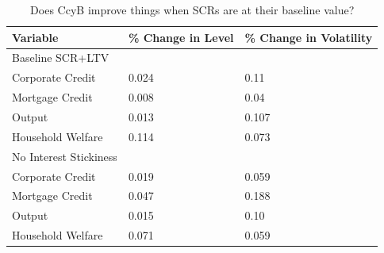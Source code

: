 \documentclass[12pt]{article}
\numberwithin{equation}{section}
\begin{document}
\begin{table}[h]
\caption{Does CcyB improve things when SCRs are at their baseline value? }
\begin{tabular}{l|l|l}
\small
Variable & \% Change in Level & \% Change in Volatility \\
\hline
Baseline SCR+LTV & & \\
\hline
    Corporate Credit           &       0.024   &      0.11 \\
    Mortgage Credit            &      0.008    &      0.04 \\
    Output         				&     0.013    &      0.107 \\ 
    Household Welfare       &         0.114     &     0.073\\
  
 \hline
No Interest Stickiness & & \\
\hline

    Corporate Credit           &       0.019    &      0.059 \\
    Mortgage Credit            &      0.047    &       0.188 \\
    Output         &     0.015    &    0.10 \\ 
    Household Welfare       &     0.071     &     0.059\\
  \end{tabular}
\end{table}



\FloatBarrier

\end{document}
